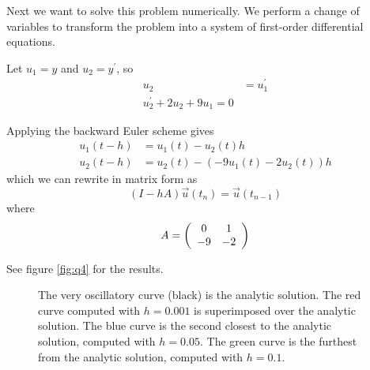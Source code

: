 \documentclass[11pt,letterpaper]{article}
\begin{document}
Next we want to solve this problem numerically.
We perform a change of variables to transform the problem into a system of
first-order differential equations.

Let $u_1 = y$ and $u_2 = y^\prime$, so
%
\begin{align*}
  u_2 &= u_1^\prime \\
  u_2^\prime + 2u_2 + 9 u_1 = 0
\end{align*}

Applying the backward Euler scheme gives
%
\begin{align*}
  u_1(t - h) &= u_1(t) - u_2(t) h \\
  u_2(t - h) &= u_2(t) - (- 9 u_1(t) - 2 u_2(t))h
\end{align*}
%
which we can rewrite in matrix form as
%
\begin{equation*}
  (I - h A) \vec u(t_n) = \vec u(t_{n-1})
\end{equation*}
%
where
\begin{equation*}
  A = \left(
    \begin{array}{cc}
      0 & 1 \\
      -9 & -2
    \end{array}
  \right)
\end{equation*}

See figure \ref{fig:q4} for the results.

\begin{figure}[ht]
  \centering
  \caption{%
    The very oscillatory curve (black) is the analytic solution.
    The red curve computed with $h = 0.001$ is superimposed over the analytic
    solution.
    The blue curve is the second closest to the analytic solution,
    computed with $h = 0.05$.
    The green curve is the furthest from the analytic solution,
    computed with $h = 0.1$.
  }
\end{figure}
\end{document}
